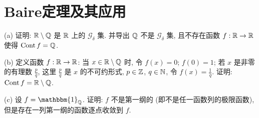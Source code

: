 \setcounter{chapter}{5}
\chapter{Baire定理及其应用}
\thispagestyle{empty}


\begin{exercise}
    (a) 证明: $\mathbb{R}\setminus\mathbb{Q}$ 是 $\mathbb{R}$ 上的 $\mathcal{G}_{\delta}$ 集.
    并导出 $\mathbb{Q}$ 不是 $\mathcal{G}_{\delta}$ 集, 且不存在函数 $f:\mathbb{R}\to\mathbb{R}$ 使得 $\operatorname{Cont}{f}=\mathbb{Q}$.

    (b) 定义函数 $f:\mathbb{R}\to\mathbb{R}$: 当 $x\in\mathbb{R}\setminus\mathbb{Q}$ 时, 令 $f(x)=0$; $f(0)=1$;
    若 $x$ 是非零的有理数 $\frac{p}{q}$, 这里 $\frac{p}{q}$ 是 $x$ 的不可约形式, $p\in\mathbb{Z}$,
    $q\in\mathbb{N}$, 令 $f(x)=\frac{1}{q}$. 证明: $\operatorname{Cont}{f}=\mathbb{R}\setminus\mathbb{Q}$.

    (c) 设 $f=\mathbbm{1}_{\FQ}$. 证明: $f$ 不是第一纲的 (即不是任一函数列的极限函数),
    但是存在一列第一纲的函数逐点收敛到 $f$.
\end{exercise}

